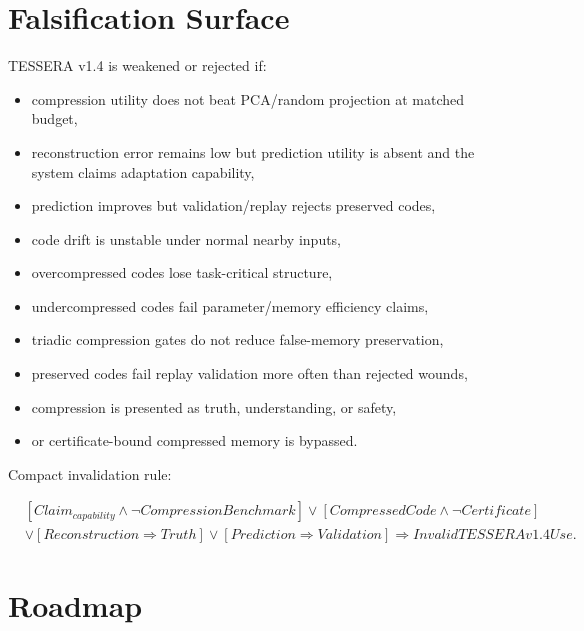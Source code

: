 \documentclass[12pt]{article}
\begin{document}
\section{Falsification Surface}

TESSERA v1.4 is weakened or rejected if:

\begin{itemize}
\item compression utility does not beat PCA/random projection at matched budget,
\item reconstruction error remains low but prediction utility is absent and the
system claims adaptation capability,
\item prediction improves but validation/replay rejects preserved codes,
\item code drift is unstable under normal nearby inputs,
\item overcompressed codes lose task-critical structure,
\item undercompressed codes fail parameter/memory efficiency claims,
\item triadic compression gates do not reduce false-memory preservation,
\item preserved codes fail replay validation more often than rejected wounds,
\item compression is presented as truth, understanding, or safety,
\item or certificate-bound compressed memory is bypassed.
\end{itemize}

Compact invalidation rule:

\[
\begin{aligned}
&[Claim_{capability}\wedge \neg CompressionBenchmark]
\vee [CompressedCode\wedge \neg Certificate]\\
&\vee [Reconstruction\Rightarrow Truth]
\vee [Prediction\Rightarrow Validation]
\Rightarrow InvalidTESSERAv1.4Use.
\end{aligned}
\]

\section{Roadmap}
\end{document}
